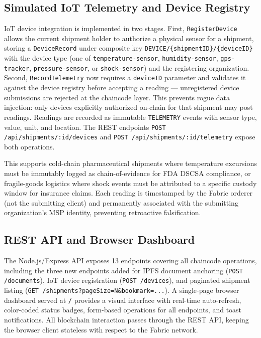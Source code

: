 \documentclass[conference]{IEEEtran}
\begin{document}
\subsection{Simulated IoT Telemetry and Device Registry}

IoT device integration is implemented in two stages.  First,
\texttt{RegisterDevice} allows the current shipment holder to authorize
a physical sensor for a shipment, storing a \texttt{DeviceRecord} under
composite key \texttt{DEVICE/\{shipmentID\}/\{deviceID\}} with the device
type (one of \texttt{temperature-sensor}, \texttt{humidity-sensor},
\texttt{gps-tracker}, \texttt{pressure-sensor}, or \texttt{shock-sensor})
and the registering organization.  Second, \texttt{RecordTelemetry} now
requires a \texttt{deviceID} parameter and validates it against the
device registry before accepting a reading --- unregistered device
submissions are rejected at the chaincode layer.  This prevents rogue
data injection: only devices explicitly authorized on-chain for that
shipment may post readings.  Readings are recorded as immutable
\texttt{TELEMETRY} events with sensor type, value, unit, and location.
The REST endpoints \texttt{POST /api/shipments/:id/devices} and
\texttt{POST /api/shipments/:id/telemetry} expose both operations.

This supports cold-chain pharmaceutical shipments where temperature
excursions must be immutably logged as chain-of-evidence for FDA DSCSA
compliance, or fragile-goods logistics where shock events must be attributed
to a specific custody window for insurance claims.  Each reading is
timestamped by the Fabric orderer (not the submitting client) and permanently
associated with the submitting organization's MSP identity, preventing
retroactive falsification.

\subsection{REST API and Browser Dashboard}

The Node.js/Express API exposes 13 endpoints covering all chaincode
operations, including the three new endpoints added for IPFS document
anchoring (\texttt{POST /documents}), IoT device registration
(\texttt{POST /devices}), and paginated shipment listing
(\texttt{GET /shipments?pageSize=N\&bookmark=...}).  A single-page browser
dashboard served at \texttt{/} provides a visual interface with real-time
auto-refresh, color-coded status badges, form-based operations for all
endpoints, and toast notifications.  All blockchain interaction passes
through the REST API, keeping the browser client stateless with respect to
the Fabric network.
\end{document}

